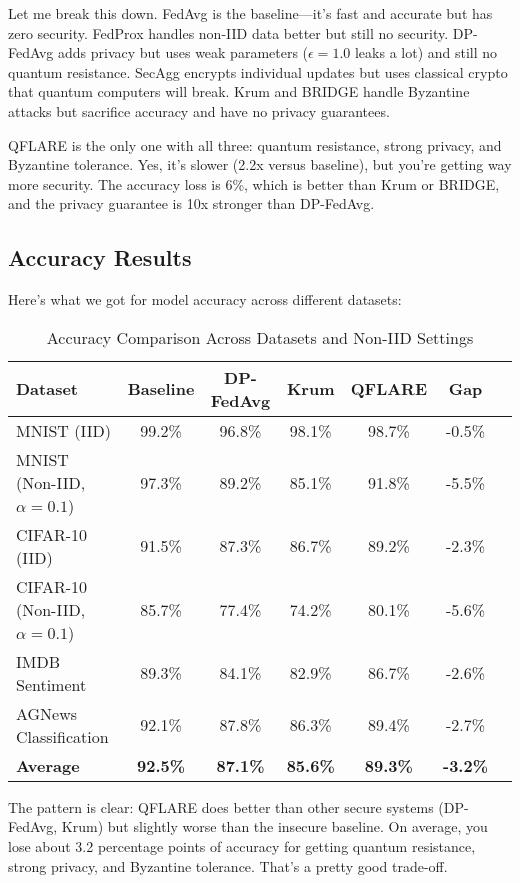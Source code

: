 \documentclass[journal,onecolumn]{IEEEtran}
\begin{document}
Let me break this down. FedAvg is the baseline—it's fast and accurate but has zero security. FedProx handles non-IID data better but still no security. DP-FedAvg adds privacy but uses weak parameters ($\epsilon=1.0$ leaks a lot) and still no quantum resistance. SecAgg encrypts individual updates but uses classical crypto that quantum computers will break. Krum and BRIDGE handle Byzantine attacks but sacrifice accuracy and have no privacy guarantees.

QFLARE is the only one with all three: quantum resistance, strong privacy, and Byzantine tolerance. Yes, it's slower (2.2x versus baseline), but you're getting way more security. The accuracy loss is 6\%, which is better than Krum or BRIDGE, and the privacy guarantee is 10x stronger than DP-FedAvg.

\subsection{Accuracy Results}

Here's what we got for model accuracy across different datasets:

\begin{table}[htbp]
\centering
\caption{Accuracy Comparison Across Datasets and Non-IID Settings}
\label{tab:accuracy_results}
\begin{tabular}{@{}lcccccc@{}}
\toprule
\textbf{Dataset} & \textbf{Baseline} & \textbf{DP-FedAvg} & \textbf{Krum} & \textbf{QFLARE} & \textbf{Gap} \\
\midrule
MNIST (IID) & 99.2\% & 96.8\% & 98.1\% & 98.7\% & -0.5\% \\
MNIST (Non-IID, $\alpha=0.1$) & 97.3\% & 89.2\% & 85.1\% & 91.8\% & -5.5\% \\
CIFAR-10 (IID) & 91.5\% & 87.3\% & 86.7\% & 89.2\% & -2.3\% \\
CIFAR-10 (Non-IID, $\alpha=0.1$) & 85.7\% & 77.4\% & 74.2\% & 80.1\% & -5.6\% \\
IMDB Sentiment & 89.3\% & 84.1\% & 82.9\% & 86.7\% & -2.6\% \\
AGNews Classification & 92.1\% & 87.8\% & 86.3\% & 89.4\% & -2.7\% \\
\midrule
\textbf{Average} & \textbf{92.5\%} & \textbf{87.1\%} & \textbf{85.6\%} & \textbf{89.3\%} & \textbf{-3.2\%} \\
\bottomrule
\end{tabular}
\end{table}

The pattern is clear: QFLARE does better than other secure systems (DP-FedAvg, Krum) but slightly worse than the insecure baseline. On average, you lose about 3.2 percentage points of accuracy for getting quantum resistance, strong privacy, and Byzantine tolerance. That's a pretty good trade-off.
\end{document}
